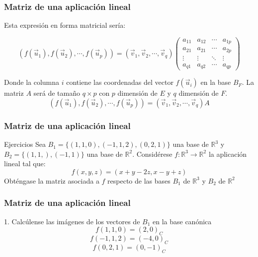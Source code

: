 \documentclass{beamer}
\begin{document}
       \begin{frame}
  \frametitle{Matriz de una aplicaci\'on lineal}
Esta expresi\'on en forma matricial ser\'ia:

 \[ (f(\vec u_1),f(\vec u_2), \cdots , f(\vec u_p) ) = ( \vec v_1,\vec v_2,\cdots ,\vec v_q ) \left(\begin{array}{cccc}a_{11} & a_{12} & \cdots & a_{1p} \\a_{21} & a_{21} & \cdots & a_{2p} \\\vdots & \vdots & \ddots & \vdots \\a_{q1} & a_{q2} & \cdots & a_{qp}\end{array}\right) \]
 
 Donde la columna $i$ contiene las coordenadas del vector $f(\vec u_i)$ en la base $B_F$. La matriz $A$ ser\'a de tama\~no $q\times p$ con $p$ dimensi\'on de $E$ y $q$ dimensi\'on de $F$. 
  \[ (f(\vec u_1),f(\vec u_2), \cdots , f(\vec u_p) ) = ( \vec v_1,\vec v_2,\cdots ,\vec v_q ) A\]

  \end{frame}
    
    
           \begin{frame}
  \frametitle{Matriz de una aplicaci\'on lineal}
\begin{block}{Ejercicios}
Sea $B_1 = \{(1,1,0),(-1,1,2),(0,2,1)\}$ una base de $\mathbb R^3$ y $B_2=\{(1,1,),(-1,1)\}$ una base de $\mathbb R^2$. Consid\'erese $f:\mathbb R^3 \longrightarrow \mathbb R^2$ la aplicaci\'on lineal tal que:
 \[f(x,y,z) = (x+y-2z, x-y+z)\]
Obt\'engase la matriz asociada a $f$ respecto de las bases $B_1$ de $\mathbb R^3$ y $B_2$ de $\mathbb R^2$
\end{block}
  \end{frame}



           \begin{frame}
  \frametitle{Matriz de una aplicaci\'on lineal}
\begin{block}{1. Calc\'ulense las im\'agenes de los vectores de $B_1$ en la base can\'onica}
\[f(1,1,0) = (2,0)_C\]
\[f(-1,1,2) = (-4,0)_C\]
\[f(0,2,1) = (0,-1)_C\]

\end{block}
  \end{frame}    
  
\end{document}
